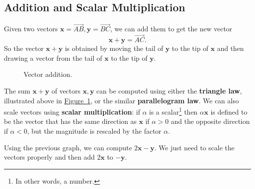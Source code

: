 \documentclass[10pt,]{book}
\newcommand{\terminology}[1]{\textbf{#1}}
\theoremstyle{ptxplainnotitle}
\theoremstyle{ptxplaintitle}
\theoremstyle{ptxplainnotitle}
\theoremstyle{ptxplaintitle}
\theoremstyle{ptxplainnotitle}
\theoremstyle{ptxplaintitle}
\theoremstyle{ptxdefinitionnotitle}
\theoremstyle{ptxdefinitiontitle}
\theoremstyle{ptxdefinitionnotitle}
\theoremstyle{ptxdefinitiontitle}
\theoremstyle{ptxdefinitionnotitle}
\theoremstyle{ptxdefinitiontitle}
\theoremstyle{ptxdefinitionnotitle}
\theoremstyle{ptxdefinitiontitle}
\theoremstyle{ptxdefinitionnotitle}
\theoremstyle{ptxdefinitiontitle}
\numberwithin{equation}{section}
\newcommand{\vv}[1]{\mathbf{#1}}
\begin{document}
\subsection[{Addition and Scalar Multiplication}]{Addition and Scalar Multiplication}\label{subsection-addition-and-scalar-multiplication}
\hypertarget{p-741}{}%
Given two vectors \(\vv{x} = \overrightarrow{AB},\vv{y}=\overrightarrow{BC}\), we can add them to get the new vector%
%
\begin{equation*}
\vv{x}+\vv{y} = \overrightarrow{AC}.
\end{equation*}
\hypertarget{p-742}{}%
So the vector \(\vv{x}+\vv{y}\) is obtained by moving the tail of \(\vv{y}\) to the tip of \(\vv{x}\) and then drawing a vector from the tail of \(\vv{x}\) to the tip of \(\vv{y}\).%
\begin{figure}
\centering
{
}
\caption{Vector addition.\label{figure-vector-addition}}
\end{figure}
\hypertarget{p-743}{}%
The sum \(\vv{x}+\vv{y}\) of vectors \(\vv{x},\vv{y}\) can be computed using either the \terminology{triangle law}, illustrated above in \hyperref[figure-vector-addition]{Figure~\ref{figure-vector-addition}}, or the similar \terminology{parallelogram law}. We can also scale vectors using \terminology{scalar multiplication}: if \(\alpha\) is a scalar\footnote{In other words, a number.\label{fn-2}} then \(\alpha\vv{x}\) is defined to be the vector that has the same direction as \(\vv{x}\) if \(\alpha>0\) and the opposite direction if \(\alpha<0\), but the magnitude is rescaled by the factor \(\alpha\).%
\begin{example}\label{example-vector-subtraction}
\hypertarget{p-744}{}%
Using the previous graph, we can compute \(2\vv{x}-\vv{y}\). We just need to scale the vectors properly and then add \(2\vv{x}\) to \(-\vv{y}\).%
\end{example}
\typeout{************************************************}
\typeout{************************************************}
\end{document}
